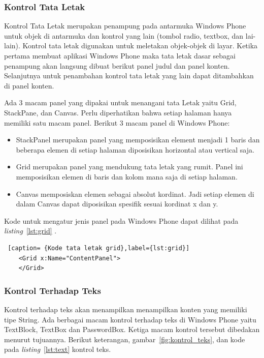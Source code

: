 \subsubsection{Kontrol Tata Letak}
\label{subsubsec:Kontrol Tata Letak}
\hspace{0.5cm} Kontrol Tata Letak merupakan penampung pada antarmuka Windows Phone untuk objek di antarmuka dan kontrol yang lain (tombol radio, textbox, dan lai-lain). Kontrol tata letak digunakan untuk meletakan objek-objek di layar. Ketika pertama membuat aplikasi Windows Phone maka tata letak dasar sebagai penampung akan langsung dibuat berikut panel judul dan panel konten. Selanjutnya untuk penambahan kontrol tata letak yang lain dapat ditambahkan di panel konten.


\hspace{0.5cm} Ada 3 macam panel yang dipakai untuk menangani tata Letak yaitu Grid, StackPane, dan Canvas. Perlu diperhatikan bahwa setiap halaman hanya memiliki satu macam panel. Berikut 3 macam panel di Windows Phone:

\begin{itemize}
	\item StackPanel merupakan panel yang memposisikan element menjadi 1 baris dan beberapa elemen di setiap halaman diposisikan horizontal atau vertical saja.
	\item Grid merupakan panel yang mendukung tata letak yang rumit. Panel ini memposisikan elemen di baris dan kolom mana saja di setiap halaman.
	\item Canvas memposiskan elemen sebagai absolut kordinat. Jadi setiap elemen di dalam Canvas dapat diposisikan spesifik sesuai kordinat x dan y.
\end{itemize}

Kode untuk mengatur jenis panel pada Windows Phone dapat dilihat pada \textit{listing}~\ref{lst:grid}	.
\begin{lstlisting} [caption= {Kode tata letak grid},label={lst:grid}]
	<Grid x:Name="ContentPanel">
	</Grid>
\end{lstlisting}
	
\subsubsection{Kontrol Terhadap Teks}
\label{subsubsec:Kontrol Terhadap Teks}
\hspace{0.5cm} Kontrol terhadap teks  akan menampilkan menampilkan konten yang memiliki tipe String. Ada berbagai macam kontrol terhadap teks di Windows Phone yaitu TextBlock, TextBox dan PasswordBox. Ketiga macam kontrol tersebut dibedakan menurut tujuannya. Berikut keterangan, gambar~\ref{fig:kontrol_teks}, dan kode pada \textit{listing}~\ref{lst:text} kontrol teks.

